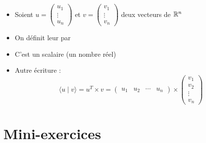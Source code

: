 \begin{frame}
\begin{itemize}[<+->]\setlength{\itemsep}{6pt}
  \item Soient $u = \left(\begin{smallmatrix} u_1\\ \vdots \\ u_n \end{smallmatrix}\right)$ 
et $v = \left(\begin{smallmatrix} v_1\\ \vdots \\ v_n \end{smallmatrix}\right)$
deux vecteurs de $\mathbb{R}^n$
  
  \item On définit leur  par
  
  \item C'est un scalaire (un nombre réel)
  
  \item Autre écriture :
$$\langle u \mid v \rangle = u^T \times v = 
\begin{pmatrix} u_1 & u_2 & \cdots & u_n \end{pmatrix}\times
\begin{pmatrix} v_1 \\ v_2 \\ \vdots \\ v_n \end{pmatrix} $$
  
\end{itemize}

\end{frame}



\section{Mini-exercices}

